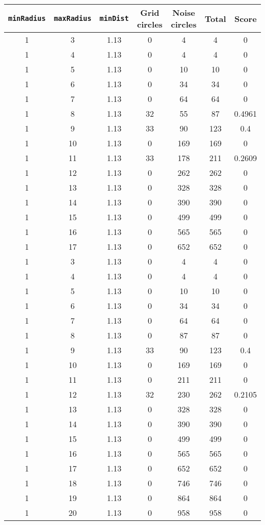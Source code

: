 \documentclass[letterpaper, 12pt]{article}
\begin{document}
\begin{longtable}{|c|c|c|c|c|c|c|}
\hline
\textbf{\texttt{minRadius}} & \textbf{\texttt{maxRadius}} & \textbf{\texttt{minDist}} & \textbf{Grid circles} & \textbf{Noise circles} & \textbf{Total} & \textbf{Score} \\
\hline
1 & 3 & 1.13 & 0 & 4 & 4 & 0 \\
\hline
1 & 4 & 1.13 & 0 & 4 & 4 & 0 \\
\hline
1 & 5 & 1.13 & 0 & 10 & 10 & 0 \\
\hline
1 & 6 & 1.13 & 0 & 34 & 34 & 0 \\
\hline
1 & 7 & 1.13 & 0 & 64 & 64 & 0 \\
\hline
1 & 8 & 1.13 & 32 & 55 & 87 & 0.4961 \\
\hline
1 & 9 & 1.13 & 33 & 90 & 123 & 0.4 \\
\hline
1 & 10 & 1.13 & 0 & 169 & 169 & 0 \\
\hline
1 & 11 & 1.13 & 33 & 178 & 211 & 0.2609 \\
\hline
1 & 12 & 1.13 & 0 & 262 & 262 & 0 \\
\hline
1 & 13 & 1.13 & 0 & 328 & 328 & 0 \\
\hline
1 & 14 & 1.13 & 0 & 390 & 390 & 0 \\
\hline
1 & 15 & 1.13 & 0 & 499 & 499 & 0 \\
\hline
1 & 16 & 1.13 & 0 & 565 & 565 & 0 \\
\hline
1 & 17 & 1.13 & 0 & 652 & 652 & 0 \\
\hline
1 & 3 & 1.13 & 0 & 4 & 4 & 0 \\
\hline
1 & 4 & 1.13 & 0 & 4 & 4 & 0 \\
\hline
1 & 5 & 1.13 & 0 & 10 & 10 & 0 \\
\hline
1 & 6 & 1.13 & 0 & 34 & 34 & 0 \\
\hline
1 & 7 & 1.13 & 0 & 64 & 64 & 0 \\
\hline
1 & 8 & 1.13 & 0 & 87 & 87 & 0 \\
\hline
1 & 9 & 1.13 & 33 & 90 & 123 & 0.4 \\
\hline
1 & 10 & 1.13 & 0 & 169 & 169 & 0 \\
\hline
1 & 11 & 1.13 & 0 & 211 & 211 & 0 \\
\hline
1 & 12 & 1.13 & 32 & 230 & 262 & 0.2105 \\
\hline
1 & 13 & 1.13 & 0 & 328 & 328 & 0 \\
\hline
1 & 14 & 1.13 & 0 & 390 & 390 & 0 \\
\hline
1 & 15 & 1.13 & 0 & 499 & 499 & 0 \\
\hline
1 & 16 & 1.13 & 0 & 565 & 565 & 0 \\
\hline
1 & 17 & 1.13 & 0 & 652 & 652 & 0 \\
\hline
1 & 18 & 1.13 & 0 & 746 & 746 & 0 \\
\hline
1 & 19 & 1.13 & 0 & 864 & 864 & 0 \\
\hline
1 & 20 & 1.13 & 0 & 958 & 958 & 0 \\
\hline
\end{longtable}
\end{document}
